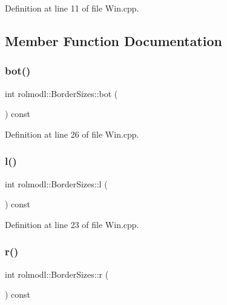 Definition at line 11 of file Win.\+cpp.



\subsection{Member Function Documentation}
\mbox{\label{structrolmodl_1_1_border_sizes_acd2836373349038673f32df645778ef5}} 
\subsubsection{\texorpdfstring{bot()}{bot()}}
{\footnotesize\ttfamily int rolmodl\+::\+Border\+Sizes\+::bot (\begin{DoxyParamCaption}{ }\end{DoxyParamCaption}) const\hspace{0.3cm}{\ttfamily [noexcept]}}



Definition at line 26 of file Win.\+cpp.

\mbox{\label{structrolmodl_1_1_border_sizes_a4906a70ed9d5c1e8a231682a16bea323}} 
\subsubsection{\texorpdfstring{l()}{l()}}
{\footnotesize\ttfamily int rolmodl\+::\+Border\+Sizes\+::l (\begin{DoxyParamCaption}{ }\end{DoxyParamCaption}) const\hspace{0.3cm}{\ttfamily [noexcept]}}



Definition at line 23 of file Win.\+cpp.

\mbox{\label{structrolmodl_1_1_border_sizes_a3ae3799a0ae840b26b76b966b71c0552}} 
\subsubsection{\texorpdfstring{r()}{r()}}
{\footnotesize\ttfamily int rolmodl\+::\+Border\+Sizes\+::r (\begin{DoxyParamCaption}{ }\end{DoxyParamCaption}) const\hspace{0.3cm}{\ttfamily [noexcept]}}



